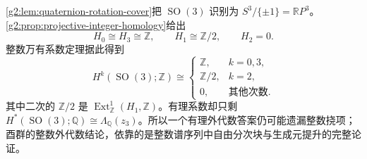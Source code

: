 \begin{example}\label{g2:exm:rotation-torsion-comparison}
	\cref{g2:lem:quaternion-rotation-cover}把 \(\operatorname{SO}(3)\) 识别为 \(S^3/\{\pm1\}=\mathbb RP^3\)。\cref{g2:prop:projective-integer-homology}给出
	\[
		H_0\cong H_3\cong\mathbb Z,\qquad H_1\cong\mathbb Z/2,\qquad H_2=0.
	\]
	整数万有系数定理据此得到
	\[
		H^k(\operatorname{SO}(3);\mathbb Z)\cong
		\begin{cases}
			\mathbb Z,&k=0,3,\\
			\mathbb Z/2,&k=2,\\
			0,&\text{其他次数}.
		\end{cases}
	\]
	其中二次的 \(\mathbb Z/2\) 是 \(\operatorname{Ext}_{\mathbb Z}^1(H_1,\mathbb Z)\)。有理系数却只剩 \(H^*(\operatorname{SO}(3);\mathbb Q)\cong\Lambda_{\mathbb Q}(z_3)\)。所以一个有理外代数答案仍可能遗漏整数挠项；酉群的整数外代数结论，依靠的是整数谱序列中自由分次块与生成元提升的完整论证。
\end{example}

